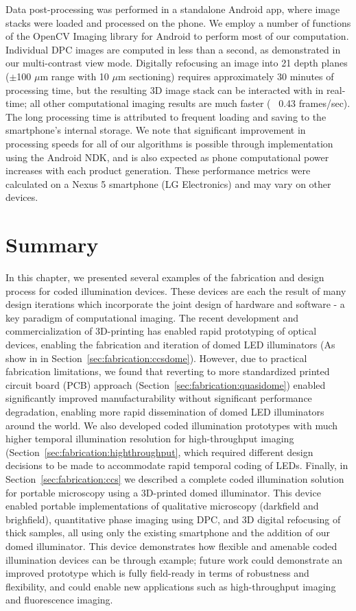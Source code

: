 Data post-processing was performed in a standalone Android app, where image stacks were loaded and processed on the phone. We employ a number of functions of the OpenCV Imaging library for Android to perform most of our computation. Individual DPC images are computed in less than a second, as demonstrated in our multi-contrast view mode. Digitally refocusing an image into 21 depth planes ($\pm$100 $\mu$m range with 10 $\mu$m sectioning) requires approximately 30 minutes of processing time, but the resulting 3D image stack can be interacted with in real-time; all other computational imaging results are much faster (~ 0.43 frames/sec). The long processing time is attributed to frequent loading and saving to the smartphone's internal storage. We note that significant improvement in processing speeds for all of our algorithms is possible through implementation using the Android NDK, and is also expected as phone computational power increases with each product generation. These performance metrics were calculated on a Nexus 5 smartphone (LG Electronics) and may vary on other devices.

\section{Summary}
In this chapter, we presented several examples of the fabrication and design process for coded illumination devices. These devices are each the result of many design iterations which incorporate the joint design of hardware and software - a key paradigm of computational imaging. The recent development and commercialization of 3D-printing has enabled rapid prototyping of optical devices, enabling the fabrication and iteration of domed LED illuminators (As show in in Section~\ref{sec:fabrication:ccsdome}). However, due to practical fabrication limitations, we found that reverting to more standardized printed circuit board (PCB) approach (Section~\ref{sec:fabrication:quasidome}) enabled significantly improved manufacturability without significant performance degradation, enabling more rapid dissemination of domed LED illuminators around the world. We also developed coded illumination prototypes with much higher temporal illumination resolution for high-throughput imaging (Section~\ref{sec:fabrication:highthroughput}, which required different design decisions to be made to accommodate rapid temporal coding of LEDs. Finally, in Section~\ref{sec:fabrication:ccs} we described a complete coded illumination solution for portable microscopy using a 3D-printed domed illuminator. This device enabled portable implementations of qualitative microscopy (darkfield and brighfield), quantitative phase imaging using DPC, and 3D digital refocusing of thick samples, all using only the existing smartphone and the addition of our domed illuminator. This device demonstrates how flexible and amenable coded illumination devices can be through example; future work could demonstrate an improved prototype which is fully field-ready in terms of robustness and flexibility, and could enable new applications such as high-throughput imaging and fluorescence imaging.
